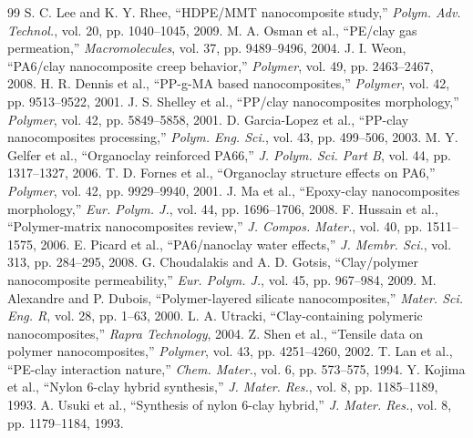 \documentclass[conference]{IEEEtran}
\begin{document}
\begin{thebibliography}{99}
 S. C. Lee and K. Y. Rhee, ``HDPE/MMT nanocomposite study,'' \emph{Polym. Adv. Technol.}, vol. 20, pp. 1040--1045, 2009.
 M. A. Osman et al., ``PE/clay gas permeation,'' \emph{Macromolecules}, vol. 37, pp. 9489--9496, 2004.
 J. I. Weon, ``PA6/clay nanocomposite creep behavior,'' \emph{Polymer}, vol. 49, pp. 2463--2467, 2008.
 H. R. Dennis et al., ``PP-g-MA based nanocomposites,'' \emph{Polymer}, vol. 42, pp. 9513--9522, 2001.
 J. S. Shelley et al., ``PP/clay nanocomposites morphology,'' \emph{Polymer}, vol. 42, pp. 5849--5858, 2001.
 D. Garcia-Lopez et al., ``PP-clay nanocomposites processing,'' \emph{Polym. Eng. Sci.}, vol. 43, pp. 499--506, 2003.
 M. Y. Gelfer et al., ``Organoclay reinforced PA66,'' \emph{J. Polym. Sci. Part B}, vol. 44, pp. 1317--1327, 2006.
 T. D. Fornes et al., ``Organoclay structure effects on PA6,'' \emph{Polymer}, vol. 42, pp. 9929--9940, 2001.
 J. Ma et al., ``Epoxy-clay nanocomposites morphology,'' \emph{Eur. Polym. J.}, vol. 44, pp. 1696--1706, 2008.
 F. Hussain et al., ``Polymer-matrix nanocomposites review,'' \emph{J. Compos. Mater.}, vol. 40, pp. 1511--1575, 2006.
 E. Picard et al., ``PA6/nanoclay water effects,'' \emph{J. Membr. Sci.}, vol. 313, pp. 284--295, 2008.
 G. Choudalakis and A. D. Gotsis, ``Clay/polymer nanocomposite permeability,'' \emph{Eur. Polym. J.}, vol. 45, pp. 967--984, 2009.
 M. Alexandre and P. Dubois, ``Polymer-layered silicate nanocomposites,'' \emph{Mater. Sci. Eng. R}, vol. 28, pp. 1--63, 2000.
 L. A. Utracki, ``Clay-containing polymeric nanocomposites,'' \emph{Rapra Technology}, 2004.
 Z. Shen et al., ``Tensile data on polymer nanocomposites,'' \emph{Polymer}, vol. 43, pp. 4251--4260, 2002.
 T. Lan et al., ``PE-clay interaction nature,'' \emph{Chem. Mater.}, vol. 6, pp. 573--575, 1994.
 Y. Kojima et al., ``Nylon 6-clay hybrid synthesis,'' \emph{J. Mater. Res.}, vol. 8, pp. 1185--1189, 1993.
 A. Usuki et al., ``Synthesis of nylon 6-clay hybrid,'' \emph{J. Mater. Res.}, vol. 8, pp. 1179--1184, 1993.
\end{thebibliography}
\end{document}
